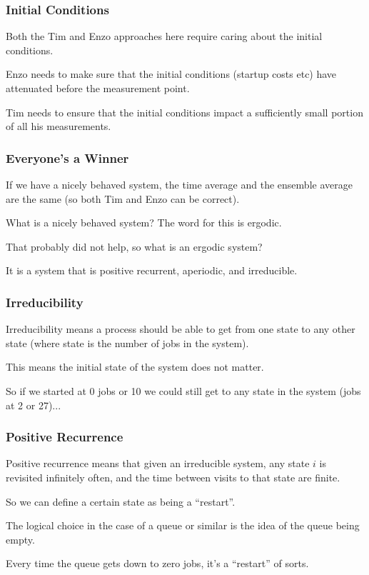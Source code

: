 \begin{frame}
\frametitle{Initial Conditions}

Both the Tim and Enzo approaches here require caring about the initial conditions. 

Enzo needs to make sure that the initial conditions (startup costs etc) have attenuated before the measurement point. 

Tim needs to ensure that the initial conditions impact a sufficiently small portion of all his measurements.

\end{frame}



\begin{frame}
\frametitle{Everyone's a Winner}

If we have a nicely behaved system, the time average and the ensemble average are the same (so both Tim and Enzo can be correct). 

What is a nicely behaved system? The word for this is \alert{ergodic}. 

That probably did not help, so what is an ergodic system? 

It is a system that is positive recurrent, aperiodic, and irreducible.

\end{frame}



\begin{frame}
\frametitle{Irreducibility}

\alert{Irreducibility} means a process should be able to get from one state to any other state (where state is the number of jobs in the system). 

This means the initial state of the system does not matter. 

So if we started at 0 jobs or 10 we could still get to any state in the system (jobs at 2 or 27)...

\end{frame}



\begin{frame}
\frametitle{Positive Recurrence}

\alert{Positive recurrence} means that given an irreducible system, any state $i$ is revisited infinitely often, and the time between visits to that state are finite. 

So we can define a certain state as being a ``restart''. 

The logical choice in the case of a queue or similar is the idea of the queue being empty. 

Every time the queue gets down to zero jobs, it's a ``restart'' of sorts. 

\end{frame}



